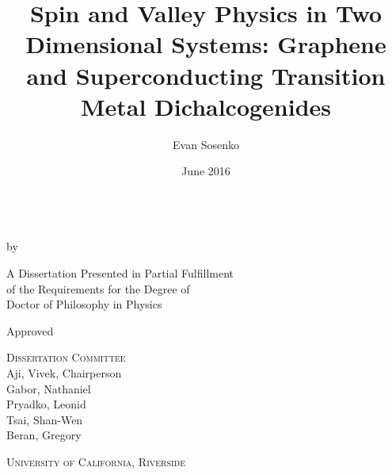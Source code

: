 \title{Spin and Valley Physics in Two Dimensional Systems: %
  Graphene and Superconducting Transition Metal Dichalcogenides}
\author{Evan Sosenko}
\date{June 2016}

\newcommand{\thedegree}{Doctor of Philosophy}
\newcommand{\thefield}{Physics}
\newcommand{\theuniversity}{University of California, Riverside}
\newcommand{\thecommittee}{
  Aji, Vivek, Chairperson \\
  Gabor, Nathaniel \\
  Pryadko, Leonid \\
  Tsai, Shan-Wen \\
  Beran, Gregory
}

\clearpage
\thispagestyle{empty}
\centering

\textsc{\thetitle} \\
by \\
\textsc{\theauthor}

\vfill

A Dissertation Presented in Partial Fulfillment \\
of the Requirements for the Degree of \\
\thedegree{} in \thefield{}

Approved
\thedate

\vfill

\textsc{Dissertation Committee} \\
\thecommittee

\vfill

\textsc{\theuniversity}
\clearpage
